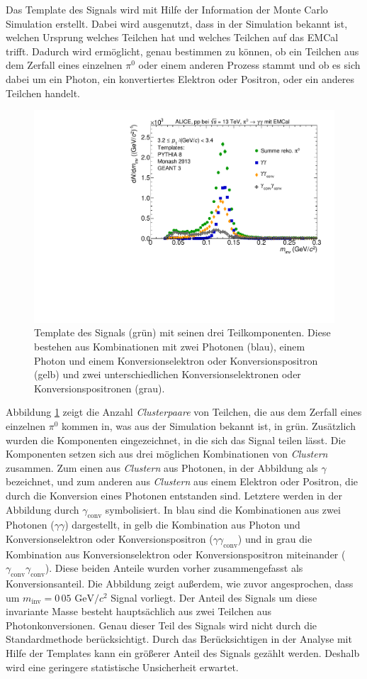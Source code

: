 Das Template des Signals wird mit Hilfe der Information der Monte Carlo Simulation erstellt.
Dabei wird ausgenutzt, dass in der Simulation bekannt ist, welchen Ursprung welches Teilchen hat und welches Teilchen auf das EMCal trifft.
Dadurch wird ermöglicht, genau bestimmen zu können, ob ein Teilchen aus dem Zerfall eines einzelnen $\pi^{0}$ oder einem anderen Prozess stammt und ob es sich dabei um ein Photon, ein konvertiertes Elektron oder Positron, oder ein anderes Teilchen handelt.
\begin{figure}[tp]
\centering
\includegraphics[width=.75\linewidth]{PeakTemplateMotivation10_Data_2016.pdf}
\caption{Template des Signals (grün) mit seinen drei Teilkomponenten.
Diese bestehen aus Kombinationen mit zwei Photonen (blau), einem Photon und einem Konversionselektron oder Konversionspositron (gelb) und zwei unterschiedlichen Konversionselektronen oder Konversionspositronen (grau).}
\label{fig:SigTemp}
\end{figure}
\newline
Abbildung \ref{fig:SigTemp} zeigt die Anzahl \textit{Clusterpaare} von Teilchen, die aus dem Zerfall eines einzelnen $\pi^{0}$ kommen in, was aus der Simulation bekannt ist, in grün. 
Zusätzlich wurden die Komponenten eingezeichnet, in die sich das Signal teilen lässt.
Die Komponenten setzen sich aus drei möglichen Kombinationen von \textit{Clustern} zusammen.
Zum einen aus \textit{Clustern} aus Photonen, in der Abbildung als $\gamma$ bezeichnet, und zum anderen aus \textit{Clustern} aus einem Elektron oder Positron, die durch die Konversion  eines Photonen entstanden sind.
Letztere werden in der Abbildung durch $\gamma_\text{conv}$ symbolisiert.
\newline
In blau sind die Kombinationen aus zwei Photonen ($\gamma\gamma$) dargestellt, in gelb die Kombination aus Photon und Konversionselektron oder Konversionspositron ($\gamma\gamma_\text{conv}$) und in grau die Kombination aus Konversionselektron oder Konversionspositron miteinander ($\gamma_\text{conv}\gamma_\text{conv}$).
Diese beiden Anteile wurden vorher zusammengefasst als Konversionsanteil.
\newline
Die Abbildung zeigt außerdem, wie zuvor angesprochen, dass um $m_\text{inv}=0\,05 \text{ GeV}/c^{2}$ Signal vorliegt.
Der Anteil des Signals um diese invariante Masse besteht hauptsächlich aus zwei Teilchen aus Photonkonversionen.
Genau dieser Teil des Signals wird nicht durch die Standardmethode berücksichtigt.
Durch das Berücksichtigen in der Analyse mit Hilfe der Templates kann ein größerer Anteil des Signals gezählt werden.
Deshalb wird eine geringere statistische Unsicherheit erwartet.